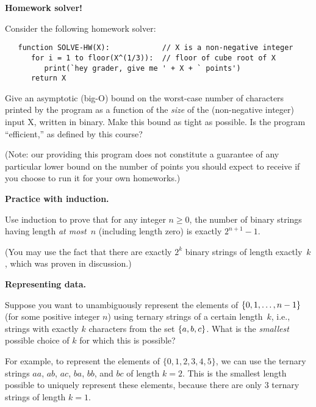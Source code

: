 \documentclass[11pt,addpoints]{exam}
\begin{document}
\begin{questions}
  \question[10] \textbf{Homework solver!}

Consider the following homework solver:
   
\begin{verbatim}
   function SOLVE-HW(X):            // X is a non-negative integer
      for i = 1 to floor(X^(1/3)):  // floor of cube root of X
         print(`hey grader, give me ' + X + ` points')
      return X
\end{verbatim} 
   
  Give an asymptotic (big-O) bound on the worst-case number of characters printed by the program as a function of the \emph{size} of the (non-negative integer) input X, written in binary.
  Make this bound as tight as possible.
  Is the program ``efficient,'' as defined by this course?
   
  (Note: our providing this program does not constitute a guarantee of any particular lower bound on the number of points you should expect to receive if you choose to run it for your own homeworks.)
   
  \begin{solution}
   
  \end{solution}

  \question[10] \textbf{Practice with induction.}
  
  Use induction to prove that for any integer $n \geq 0$, the number of binary strings having length \emph{at most}~$n$ (including length zero) is exactly $2^{n+1}-1$.

  (You may use the fact that there are exactly $2^{k}$ binary strings of length exactly~$k$, which was proven in discussion.)
  
  \begin{solution}
   
  \end{solution}
    
  \question[10] \textbf{Representing data.}

  Suppose you want to unambiguously represent the elements of $\{0, 1, \ldots, n-1\}$ (for some positive integer $n$) using ternary strings of a certain length~$k$, i.e., strings with exactly $k$ characters from the set $\{a,b,c\}$.
  What is the \emph{smallest} possible choice of $k$ for which this is possible?
  
  For example, to represent the elements of $\{0,1,2,3,4,5\}$, we can use the ternary strings $aa$, $ab$, $ac$, $ba$, $bb$, and $bc$ of length $k=2$.
  This is the smallest length possible to uniquely represent these elements, because there are only $3$ ternary strings of length $k=1$.
  

\end{questions}
\end{document}
